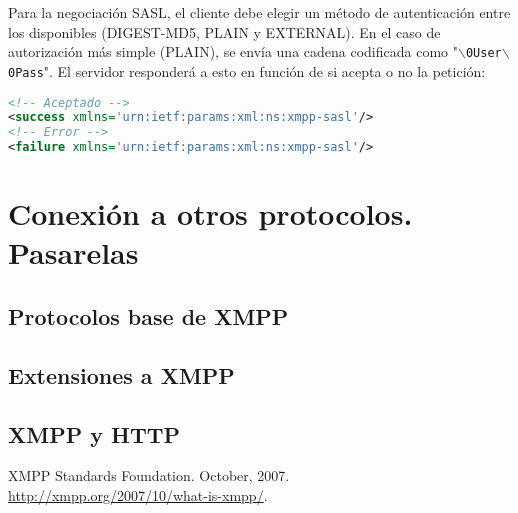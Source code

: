\documentclass[a4paper, 11pt]{article} %
\begin{document}
    Para la negociación SASL, el cliente debe elegir un método de autenticación entre los disponibles
    (DIGEST-MD5, PLAIN y EXTERNAL). En el caso de autorización más simple (PLAIN), se envía una cadena
    codificada como "\texttt{$\backslash$0User$\backslash$0Pass}". El servidor responderá a esto en 
    función de si acepta o no la petición:
    \begin{lstlisting}[language=XML]
<!-- Aceptado -->
<success xmlns='urn:ietf:params:xml:ns:xmpp-sasl'/>
<!-- Error -->
<failure xmlns='urn:ietf:params:xml:ns:xmpp-sasl'/>
    \end{lstlisting}

  
\section{Conexión a otros protocolos. Pasarelas}
  \subsection{Protocolos base de XMPP}
  \subsection{Extensiones a XMPP}
  \subsection{XMPP y HTTP}
  
  

  
\vfill
\begin{thebibliography}{9}

  XMPP Standards Foundation. October, 2007.\\
  \url{http://xmpp.org/2007/10/what-is-xmpp/}.
  

\end{thebibliography}  
  
\end{document}
